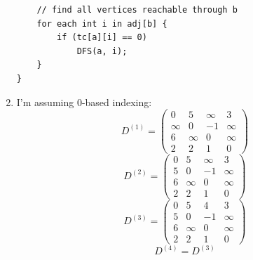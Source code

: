 \documentclass{article}
\begin{document}
\begin{enumerate}
\begin{lstlisting}
    // find all vertices reachable through b
    for each int i in adj[b] {
        if (tc[a][i] == 0)
            DFS(a, i);
    }
}
	\end{lstlisting}
\item I'm assuming 0-based indexing:
	\begin{equation*}D^{(1)}=\begin{pmatrix}
	0 & 5 & \infty & 3\\\infty & 0 & -1 & \infty\\ 6 & \infty & 0 & \infty\\2 & 2 & 1 & 0
	\end{pmatrix}\end{equation*}
	\begin{equation*}D^{(2)}=\begin{pmatrix}
	0 & 5 & \infty & 3\\5 & 0 & -1 & \infty\\6 & \infty & 0 & \infty\\2 & 2 & 1 & 0
	\end{pmatrix}\end{equation*}
	\begin{equation*}D^{(3)}=\begin{pmatrix}
	0 & 5 & 4 & 3\\5 & 0 & -1 & \infty\\6 & \infty & 0 & \infty\\2 & 2 & 1 & 0
	\end{pmatrix}\end{equation*}
	\begin{equation*}D^{(4)}=D^{(3)}\end{equation*}
\end{enumerate}
\end{document}
